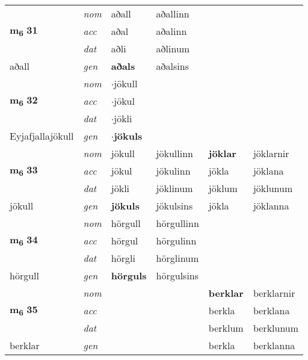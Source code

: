 \begin{longtable}[l]{llllll}
\multirow{3}{*}{{{\textbf{m{\textsubscript{6}}} \Large{\textbf{31}}}}}  & {\footnotesize{{\textit{nom}}}} & aðall & aðallinn    & \textbf{} &   \\*
 &  {\footnotesize{{\textit{acc}}}} & aðal  & aðalinn   &   &  \\*
 &  {\footnotesize{{\textit{dat}}}} & aðli & aðlinum   &  &  \\*
 {\footnotesize{aðall}} &   {\footnotesize{{\textit{gen}}}} & \textbf{aðals}  & aðalsins  &  &  \\
\cmidrule{1-6}


\multirow{3}{*}{{{\textbf{m{\textsubscript{6}}} \Large{\textbf{32}}}}}  & {\footnotesize{{\textit{nom}}}} & $\cdot$jökull &     & \textbf{} &   \\*
 &  {\footnotesize{{\textit{acc}}}} & $\cdot$jökul  &    &   &  \\*
 &  {\footnotesize{{\textit{dat}}}} & $\cdot$jökli &    &  &  \\*
 {\footnotesize{Eyjafjallajökull}} &   {\footnotesize{{\textit{gen}}}} & \textbf{$\cdot$jökuls}  &   &  &  \\
\cmidrule{1-6}


\multirow{3}{*}{{{\textbf{m{\textsubscript{6}}} \Large{\textbf{33}}}}}  & {\footnotesize{{\textit{nom}}}} & jökull & jökullinn    & \textbf{jöklar} & jöklarnir  \\*
 &  {\footnotesize{{\textit{acc}}}} & jökul  & jökulinn   & jökla  & jöklana \\*
 &  {\footnotesize{{\textit{dat}}}} & jökli & jöklinum   & jöklum & jöklunum \\*
 {\footnotesize{jökull}} &   {\footnotesize{{\textit{gen}}}} & \textbf{jökuls}  & jökulsins  & jökla & jöklanna \\
\cmidrule{1-6}


\multirow{3}{*}{{{\textbf{m{\textsubscript{6}}} \Large{\textbf{34}}}}}  & {\footnotesize{{\textit{nom}}}} & hörgull & hörgullinn    & \textbf{} &   \\*
 &  {\footnotesize{{\textit{acc}}}} & hörgul  & hörgulinn   &   &  \\*
 &  {\footnotesize{{\textit{dat}}}} & hörgli & hörglinum   &  &  \\*
 {\footnotesize{hörgull}} &   {\footnotesize{{\textit{gen}}}} & \textbf{hörguls}  & hörgulsins  &  &  \\
\cmidrule{1-6}


\multirow{3}{*}{{{\textbf{m{\textsubscript{6}}} \Large{\textbf{35}}}}}  & {\footnotesize{{\textit{nom}}}} &  &     & \textbf{berklar} & berklarnir  \\*
 &  {\footnotesize{{\textit{acc}}}} &   &    & berkla  & berklana \\*
 &  {\footnotesize{{\textit{dat}}}} &  &    & berklum & berklunum \\*
 {\footnotesize{berklar}} &   {\footnotesize{{\textit{gen}}}} & \textbf{}  &   & berkla & berklanna \\
\cmidrule{1-6}



\end{longtable}
